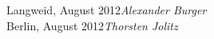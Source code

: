 \vspace{1cm}
\begin{flushright}\noindent
Langweid, August 2012\hfill {\it Alexander Burger}\\
Berlin, August 2012\hfill {\it Thorsten Jolitz}\\\end{flushright}





